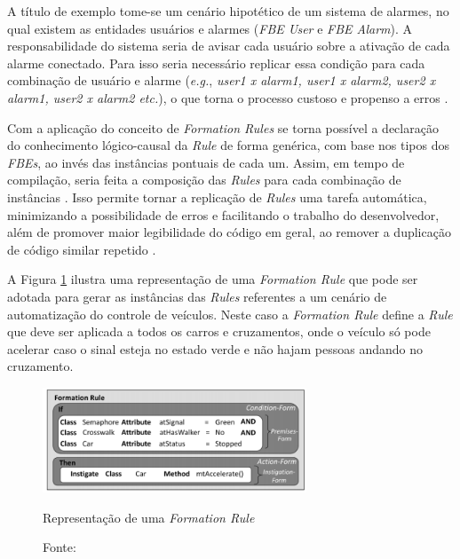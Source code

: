 A título de exemplo tome-se um cenário hipotético de um sistema de alarmes, no
qual existem as entidades usuários e alarmes (\textit{FBE User} e \textit{FBE
Alarm}). A responsabilidade do sistema seria de avisar cada usuário sobre a
ativação de cada alarme conectado. Para isso seria necessário replicar essa
condição para cada combinação de usuário e alarme (\textit{e.g.}, \textit{user1
x alarm1, user1 x alarm2, user2 x alarm1, user2 x alarm2 etc.}), o que torna o
processo custoso e propenso a erros \cite{doc_ronszcka_2019}.

Com a aplicação do conceito de \textit{Formation Rules} se torna possível a
declaração do conhecimento lógico-causal da \textit{Rule} de forma genérica, com
base nos tipos dos \textit{FBEs}, ao invés das instâncias pontuais de cada um.
Assim, em tempo de compilação, seria feita a composição das \textit{Rules} para
cada combinação de instâncias \cite{doc_ronszcka_2019}. Isso permite tornar a
replicação de \textit{Rules} uma tarefa automática, minimizando a possibilidade
de erros e facilitando o trabalho do desenvolvedor, além de promover maior
legibilidade do código em geral, ao remover a duplicação de código similar
repetido \cite{doc_ronszcka_2019}.

A Figura \ref{fig:formation_rule} ilustra uma representação de uma
\textit{Formation Rule} que pode ser adotada para gerar as instâncias das
\textit{Rules} referentes a um cenário de automatização do controle de veículos.
Neste caso a \textit{Formation Rule} define a \textit{Rule} que deve ser
aplicada a todos os carros e cruzamentos, onde o veículo só pode acelerar caso o
sinal esteja no estado verde e não hajam pessoas andando no cruzamento.

\begin{figure}[!htb]
  \centering
  \includegraphics[width=0.7\textwidth]{../figures/formation_rule.png}
  \smallskip
  \caption{Representação de uma \textit{Formation Rule}}
  \caption*{Fonte: }
  \label{fig:formation_rule}
\end{figure}

